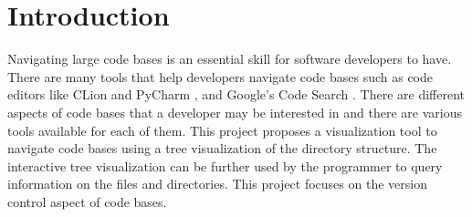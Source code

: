 \section{Introduction}
Navigating large code bases is an essential skill for software developers to have.
There are many tools that help developers navigate code bases such as code editors like CLion and PyCharm \cite{jetbrains}, and Google's Code Search \cite{googlecodesearch}. There are different aspects of code bases that a developer may be interested in and there are various tools available for each of them. This project proposes a visualization tool to navigate code bases using a tree visualization of the directory structure. The interactive tree visualization can be further used by the programmer to query information on the files and directories. This project focuses on the version control aspect of code bases.